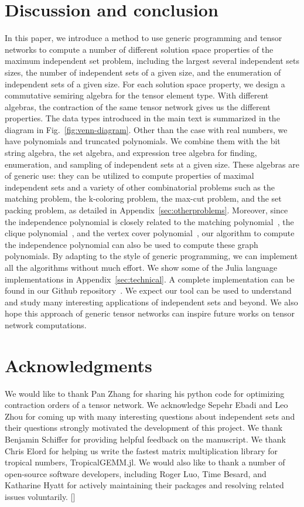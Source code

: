 \documentclass[onefignum, onetabnum]{siamart190516}
\newcommand{\<}{\langle}
\renewcommand{\>}{\rangle}
\newcommand{\Fig}[1]{Fig.~\ref{#1}}
\newcommand{\App}[1]{Appendix~\ref{#1}}
\newcommand{\blue}[1]{[{\bf  \color{blue}{JG: #1}}]}
\begin{document}
\section{Discussion and conclusion}
In this paper, we introduce a method to use generic programming and tensor networks to compute a number of different solution space properties of the maximum independent set problem,
including the largest several independent sets sizes, the number of independent sets of a given size, and
the enumeration of independent sets of a given size.
For each solution space property, we design a commutative semiring algebra for the tensor element type.
With different algebras, the contraction of the same tensor network gives us the different properties.
The data types introduced in the main text is summarized in the diagram in \Fig{fig:venn-diagram}.
Other than the case with real numbers, we have polynomials and truncated polynomials.
We combine them with the bit string algebra, the set algebra, and expression tree algebra for finding, enumeration, and sampling of independent sets at a given size.
These algebras are of generic use: they can be utilized to compute properties of maximal independent sets and a variety of other combinatorial problems such as the matching problem, the k-coloring problem, the max-cut problem, and the set packing problem, as detailed in \App{sec:otherproblems}. 
Moreover, since the independence polynomial is closely related to the matching polynomial~\cite{Levit2005}, the clique polynomial~\cite{Hoede1994}, and the vertex cover polynomial~\cite{Akbari2013},
our algorithm to compute the independence polynomial can also be used to compute these graph polynomials.
By adapting to the style of generic programming, we can implement all the algorithms without much effort.
We show some of the Julia language implementations in Appendix~\ref{sec:technical}.
A complete implementation can be found in our Github repository~\cite{GraphTensorNetworks}. 
We expect our tool can be used to understand and study many interesting applications of independent sets and beyond. We also hope this approach of generic tensor networks can inspire future works on tensor network computations.

\section*{Acknowledgments}
We would like to thank Pan Zhang for sharing his python code for optimizing contraction orders of a tensor network.
We acknowledge Sepehr Ebadi and Leo Zhou for coming up with many interesting questions about independent sets and their questions strongly motivated the development of this project.
We thank Benjamin Schiffer for providing helpful feedback on the manuscript.
We thank Chris Elord for helping us write the fastest matrix multiplication library for tropical numbers, TropicalGEMM.jl. %
We would also like to thank a number of open-source software developers, including Roger Luo, Time Besard, and Katharine Hyatt
for actively maintaining their packages and resolving related issues voluntarily.
\blue{funding information}
\end{document}
